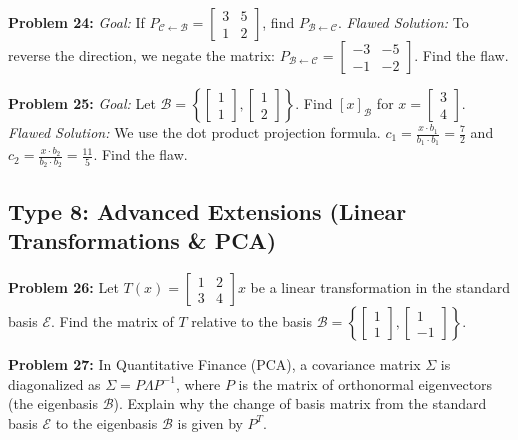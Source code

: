 \documentclass[11pt]{article}
\begin{document}
\vspace{0.5cm}
\textbf{Problem 24:} \textit{Goal:} If $P_{\mathcal{C} \leftarrow \mathcal{B}} = \begin{bmatrix} 3 & 5 \\ 1 & 2 \end{bmatrix}$, find $P_{\mathcal{B} \leftarrow \mathcal{C}}$. \textit{Flawed Solution:} To reverse the direction, we negate the matrix: $P_{\mathcal{B} \leftarrow \mathcal{C}} = \begin{bmatrix} -3 & -5 \\ -1 & -2 \end{bmatrix}$. Find the flaw.

\vspace{0.5cm}
\textbf{Problem 25:} \textit{Goal:} Let $\mathcal{B} = \left\{ \begin{bmatrix} 1 \\ 1 \end{bmatrix}, \begin{bmatrix} 1 \\ 2 \end{bmatrix} \right\}$. Find $[x]_{\mathcal{B}}$ for $x = \begin{bmatrix} 3 \\ 4 \end{bmatrix}$. \textit{Flawed Solution:} We use the dot product projection formula. $c_1 = \frac{x \cdot b_1}{b_1 \cdot b_1} = \frac{7}{2}$ and $c_2 = \frac{x \cdot b_2}{b_2 \cdot b_2} = \frac{11}{5}$. Find the flaw.

\subsection*{Type 8: Advanced Extensions (Linear Transformations \& PCA)}
\textbf{Problem 26:} Let $T(x) = \begin{bmatrix} 1 & 2 \\ 3 & 4 \end{bmatrix} x$ be a linear transformation in the standard basis $\mathcal{E}$. Find the matrix of $T$ relative to the basis $\mathcal{B} = \left\{ \begin{bmatrix} 1 \\ 1 \end{bmatrix}, \begin{bmatrix} 1 \\ -1 \end{bmatrix} \right\}$.

\vspace{0.5cm}
\textbf{Problem 27:} In Quantitative Finance (PCA), a covariance matrix $\Sigma$ is diagonalized as $\Sigma = P \Lambda P^{-1}$, where $P$ is the matrix of orthonormal eigenvectors (the eigenbasis $\mathcal{B}$). Explain why the change of basis matrix from the standard basis $\mathcal{E}$ to the eigenbasis $\mathcal{B}$ is given by $P^T$.
\end{document}
